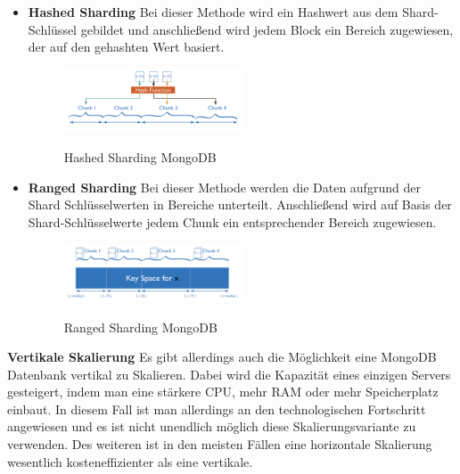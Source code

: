 \begin{itemize}
    \item \textbf{Hashed Sharding}
        \newline
        Bei dieser Methode wird ein Hashwert aus dem Shard-Schlüssel gebildet und anschließend wird jedem Block ein Bereich zugewiesen, der auf den gehashten Wert basiert.
        \begin{figure}[h!]
            \centering
            \includegraphics[width=0.5\textwidth]{pics/hashed_sharding.png}
            \caption{Hashed Sharding MongoDB}
            \cite{hashed_sharding_image}
            \label{fig:enter-label}
        \end{figure}
    \item \textbf{Ranged Sharding}
        \newline
        Bei dieser Methode werden die Daten aufgrund der Shard Schlüsselwerten in Bereiche unterteilt. Anschließend wird auf Basis der Shard-Schlüsselwerte  jedem Chunk ein entsprechender Bereich zugewiesen.
        \begin{figure}[h!]
            \centering
            \includegraphics[width=0.5\textwidth]{pics/ranged_sharding.png}
            \caption{Ranged Sharding MongoDB}
            \cite{range_sharding_image}
            \label{fig:enter-label}
        \end{figure}
\end{itemize}
\cite{mongodb_sharding}

\textbf{Vertikale Skalierung}
\newline
Es gibt allerdings auch die Möglichkeit eine MongoDB Datenbank vertikal zu Skalieren. Dabei wird die Kapazität eines einzigen Servers gesteigert, indem man eine stärkere CPU, mehr RAM oder mehr Speicherplatz einbaut. In diesem Fall ist man allerdings an den technologischen Fortschritt angewiesen und es ist nicht unendlich möglich diese Skalierungsvariante zu verwenden. Des weiteren ist in den meisten Fällen eine horizontale Skalierung wesentlich kosteneffizienter als eine vertikale.